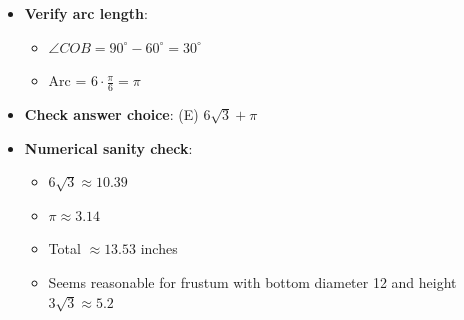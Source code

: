 \documentclass[12pt]{article}
\begin{document}
\begin{verificationbox}
\begin{itemize}[leftmargin=*]
    \item \textbf{Verify arc length}:
    \begin{itemize}
        \item $\angle COB = 90^\circ - 60^\circ = 30^\circ$
        \item Arc = $6 \cdot \frac{\pi}{6} = \pi$ \checkmark
    \end{itemize}
    \item \textbf{Check answer choice}: (E) $6\sqrt{3} + \pi$ \checkmark
    \item \textbf{Numerical sanity check}:
    \begin{itemize}
        \item $6\sqrt{3} \approx 10.39$
        \item $\pi \approx 3.14$
        \item Total $\approx 13.53$ inches
        \item Seems reasonable for frustum with bottom diameter 12 and height $3\sqrt{3} \approx 5.2$
    \end{itemize}
\end{itemize}


\end{verificationbox}
\end{document}
